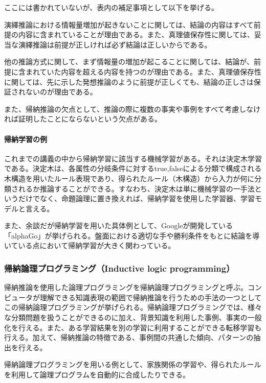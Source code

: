\documentclass[dvipdfmx]{jsarticle}
\begin{document}
ここには書かれていないが、表内の補足事項として以下を挙げる。\par
演繹推論における情報量増加が起きないことに関しては、結論の内容はすべて前提の内容に含まれていることが理由である。また、真理値保存性に関しては、妥当な演繹推論は前提が正しければ必ず結論は正しいからである。\par
他の推論方式に関して、まず情報量の増加が起こることに関しては、結論が、前提に含まれていた内容を超える内容を持つのが理由である。また、真理値保存性に関しては、先に示した発想推論のように前提が正しくても、結論の正しさは保証されないのが理由である。\par
また、帰納推論の欠点として、推論の際に複数の事実や事例をすべて考慮しなければ証明したことにならないという欠点がある。
\paragraph{帰納学習の例}これまでの講義の中から帰納学習に該当する機械学習がある。それは決定木学習である。決定木は、各属性の分岐条件に対するtrue,falseによる分類で構成される木構造を用いたルール表現であり、得られたルール（木構造）から入力が何に分類されるか推論することができる。すなわち、決定木は単に機械学習の一手法というだけでなく、命題論理に置き換えれば、帰納学習を使用した学習器、学習モデルと言える。\par
また、余談だが帰納学習を用いた具体例として、Googleが開発している「alphaGo」が挙げられる。盤面における適切な手や勝利条件をもとに結論を導いている点において帰納学習が大きく関わっている。
\subsubsection{帰納論理プログラミング（Inductive logic programming）}帰納推論を使用した論理プログラミングを帰納論理プログラミングと呼ぶ。コンピュータが理解できる知識表現の範囲で帰納推論を行うための手法の一つとしてこの帰納論理プログラミングが挙げられる。帰納論理プログラミングでは、様々な分類問題を扱うことができるのに加え、背景知識を利用した事例、事実の一般化を行える。また、ある学習結果を別の学習に利用することができる転移学習も行える。加えて、帰納推論の特徴である、事例間の共通した傾向、パターンの抽出を行える。\par
帰納論理プログラミングを用いる例として、家族関係の学習や、得られたルールを利用して論理プログラムを自動的に合成したりできる。
\end{document}
